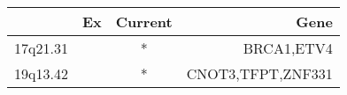 \begin{tabular}{lccr}
\toprule
{} & Ex & Current &               Gene \\
\midrule
17q21.31 &    &       * &         BRCA1,ETV4 \\
19q13.42 &    &       * &  CNOT3,TFPT,ZNF331 \\
\bottomrule
\end{tabular}
